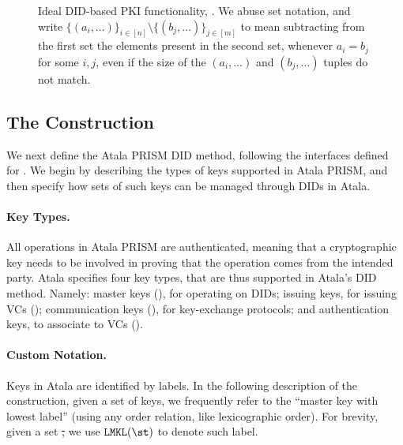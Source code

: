 \begin{figure}
\begin{framed}
  \end{framed}
  \caption{Ideal DID-based PKI functionality, \IdealGPKIDID. We abuse set
    notation, and write $\lbrace (a_i,\dots) \rbrace_{i\in[n]} \setminus
    \lbrace (b_j,\dots) \rbrace_{j\in[m]}$ to mean subtracting from the first
    set the elements present in the second set, whenever $a_i = b_j$ for some
    $i,j$, even if the size of the $(a_i,\dots)$ and $(b_j,\dots)$ tuples do not
    match.}
  \label{fig:fpkidid}
\end{figure}

\subsection{The \RealPKIDIDAtala Construction}

We next define the Atala PRISM DID method, following the interfaces defined for
\IdealGPKIDID. We begin by describing the types of keys supported in Atala
PRISM, and then specify how sets of such keys can be managed through DIDs in
Atala.

\paragraph{Key Types.} %
All operations in Atala PRISM are authenticated, meaning that a cryptographic
key needs to be involved in proving that the operation comes from the intended
party. Atala specifies four key types, that are thus supported in Atala's DID
method. Namely: master keys (\MasterKey), for operating on DIDs; issuing keys,
for issuing VCs (\IssueKey); communication keys (\CommKey), for key-exchange
protocols; and authentication keys, to associate to VCs (\AuthKey).

\paragraph{Custom Notation.} %
Keys in Atala are identified by labels. In the following description of the
\RealPKIDIDAtala construction, given a set of keys, we frequently refer to the
``master key with lowest label'' (using any order relation, like lexicographic
order).  For brevity, given a set \st, we use $\LMKL(\st)$ to denote such label.

